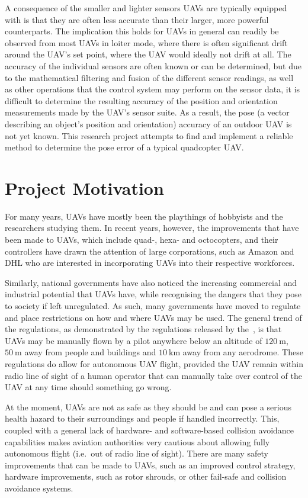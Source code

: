 A consequence of the smaller and lighter sensors UAVs are typically equipp\-ed with is that they are often less accurate than their larger, more powerful counterparts. The implication this holds for UAVs in general can readily be observed from most UAVs in loiter mode, where there is often significant drift around the UAV's set point, where the UAV would ideally not drift at all. The accuracy of the individual sensors are often known or can be determined, but due to the mathematical filtering and fusion of the different sensor readings, as well as other operations that the control system may perform on the sensor data, it is difficult to determine the resulting accuracy of the position and orientation measurements made by the UAV's sensor suite. As a result, the pose (a vector describing an object's position and orientation) accuracy of an outdoor UAV is not yet known. This research project attempts to find and implement a reliable method to determine the pose error of a typical quadcopter UAV.\@  

\section{Project Motivation}

For many years, UAVs have mostly been the playthings of hobbyists and the researchers studying them. In recent years, however, the improvements that have been made to UAVs, which include quad-, hexa- and octocopters, and their controllers have drawn the attention of large corporations, such as Amazon and DHL who are interested in incorporating UAVs into their respective workforces. 

Similarly, national governments have also noticed the increasing commercial and industrial potential that UAVs have, while recognising the dangers that they pose to society if left unregulated. As such, many governments have moved to regulate and place restrictions on how and where UAVs may be used. The general trend of the regulations, as demonstrated by the regulations released by the~\cite{sacaa-drone-regs}, is that UAVs may be manually flown by a pilot anywhere below an altitude of $\SI{120}{\m}$, $\SI{50}{\m}$ away from people and buildings and $\SI{10}{\km}$ away from any aerodrome. These regulations do allow for autonomous UAV flight, provided the UAV remain within radio line of sight of a human operator that can manually take over control of the UAV at any time should something go wrong. 

At the moment, UAVs are not as safe as they should be and can pose a serious health hazard to their surroundings and people if handled incorrectly. This, coupled with a general lack of hardware- and software-based collision avoidance capabilities makes aviation authorities very cautious about allowing fully autonomous flight (i.e.\ out of radio line of sight). There are many safety improvements that can be made to UAVs, such as an improved control strategy, hardware improvements, such as rotor shrouds, or other fail-safe and collision avoidance systems. 

